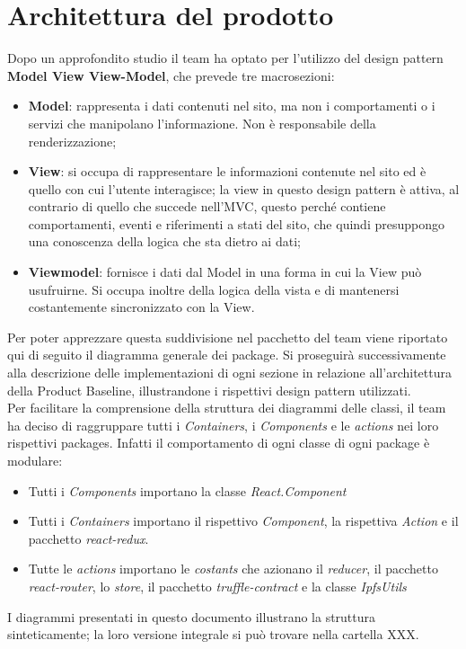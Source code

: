 \section{Architettura del prodotto}
Dopo un approfondito studio il team ha optato per l'utilizzo del design pattern \textbf{Model View View-Model}, che prevede tre macrosezioni:
\begin{itemize}
	\item \textbf{Model}: rappresenta i dati contenuti nel sito, ma non i comportamenti o i servizi che manipolano l'informazione. Non è responsabile della renderizzazione;
	\item \textbf{View}: si occupa di rappresentare le informazioni contenute nel sito ed è quello con cui l'utente interagisce; la view in questo design pattern è attiva, al contrario di quello che succede nell'MVC, questo perché contiene comportamenti, eventi e riferimenti a stati del sito, che quindi presuppongo una conoscenza della logica che sta dietro ai dati;
	\item \textbf{Viewmodel}: fornisce i dati dal Model in una forma in cui la View può usufruirne. Si occupa inoltre della logica della vista e di mantenersi costantemente sincronizzato con la View.
\end{itemize}
Per poter apprezzare questa suddivisione nel pacchetto del team viene riportato qui di seguito il diagramma generale dei package. Si proseguirà successivamente alla descrizione delle implementazioni di ogni sezione in relazione all'architettura della Product Baseline, illustrandone i rispettivi design pattern utilizzati.
\\Per facilitare la comprensione della struttura dei diagrammi delle classi, il team ha deciso di raggruppare tutti i \emph{Containers}, i \emph{Components} e le \emph{actions} nei loro rispettivi packages. Infatti il comportamento di ogni classe di ogni package è modulare:
\begin{itemize}
	\item Tutti i \emph{Components} importano la classe \emph{React.Component}
	\item Tutti i \emph{Containers} importano il rispettivo \emph{Component}, la rispettiva \emph{Action} e il pacchetto \emph{react-redux}.
	\item Tutte le \emph{actions} importano le \emph{costants} che azionano il \emph{reducer}, il pacchetto \emph{react-router}, lo \emph{store}, il pacchetto \emph{truffle-contract} e la classe \emph{IpfsUtils}
\end{itemize}
I diagrammi presentati in questo documento illustrano la struttura sinteticamente; la loro versione integrale si può trovare nella cartella XXX.

